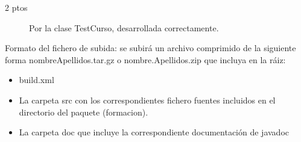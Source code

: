 \documentclass[addpoints,12pt]{exam}
\begin{document}
\begin{questions}
\begin{description}
\item[2 ptos] Por la clase TestCurso, desarrollada correctamente.
\end{description}
Formato del fichero de subida: se subirá un archivo comprimido de la siguiente forma nombreApellidos.tar.gz o nombre.Apellidos.zip que incluya en la ráiz:
\begin{itemize}
\item build.xml
\item La carpeta src con los correspondientes fichero fuentes incluidos en el directorio del paquete (formacion).
\item La carpeta doc que incluye la correspondiente documentación de javadoc
\end{itemize}
\end{questions}
\end{document}
